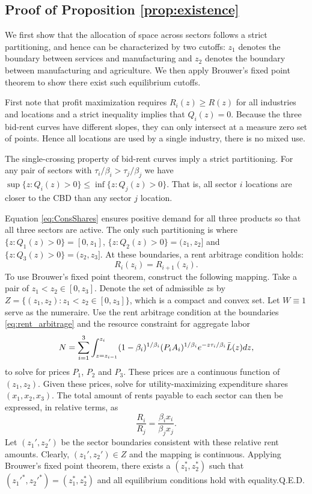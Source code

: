 \documentclass[12pt]{article}
\begin{document}
\subsection{Proof of Proposition \ref{prop:existence}}
We first show that the allocation of space across sectors follows a strict partitioning, and hence can be characterized by two cutoffs: $z_1$ denotes the boundary between services and manufacturing and $z_2$ denotes the boundary between manufacturing and agriculture. We then apply Brouwer's fixed point theorem to show there exist such equilibrium cutoffs.

First note that profit maximization requires $R_i(z)\ge R(z)$ for all industries and locations and a strict inequality implies that $Q_i(z)=0$. Because the three bid-rent curves have different slopes, they can only intersect at a measure zero set of points. Hence all locations are used by a single industry, there is no mixed use.

The single-crossing property of bid-rent curves imply a strict partitioning. For any pair of sectors with $\tau_i/\beta_i>\tau_j/\beta_j$ we have $\sup\{z: Q_i(z)>0\} \le \inf\{z: Q_j(z)>0\}$. That is, all sector $i$ locations are closer to the CBD than any sector $j$ location. 

Equation \eqref{eq:ConsShares} ensures positive demand for all three products so that all three sectors are active. The only such partitioning is where $\{z: Q_1(z)>0\} = [0,z_1]$, $\{z: Q_2(z)>0\} = (z_1,z_2]$ and $\{z: Q_3(z)>0\} = (z_2,z_3]$. At these boundaries, a rent arbitrage condition holds:
\begin{equation}\label{eq:rent_arbitrage}
	R_i(z_i) = R_{i+1}(z_i).
\end{equation}
To use Brouwer's fixed point theorem, construct the following mapping. Take a pair of $z_1<z_2 \in [0,z_3]$. Denote the set of admissible $z$s by $Z=\{(z_1,z_2): z_1<z_2 \in [0,z_3]\}$, which is a compact and convex set. Let $W\equiv 1$ serve as the numeraire. Use the rent arbitrage condition at the boundaries \eqref{eq:rent_arbitrage} and the resource constraint for aggregate labor
\[
N = \sum_{i=1}^3 \int_{z=z_{i-1}}^{z_i}(1-\beta_i)^{1/\beta_i}
	(P_iA_i)^{1/\beta_i}
	e^{- z \tau_i/\beta_i}\Bar L(z)dz,
\] 
to solve for prices $P_1$, $P_2$ and $P_3$. These prices are a continuous function of $(z_1,z_2)$. 
Given these prices, solve for utility-maximizing expenditure shares $(x_1,x_2,x_3)$. The total amount of rents payable to each sector can then be expressed, in relative terms, as
\[
\frac {R_i}
	{R_j}
=
\frac {\beta_i x_i}
	{\beta_j x_j}.
\]
Let $(z_1',z_2')$ be the sector boundaries consistent with these relative rent amounts. Clearly, $(z_1',z_2')\in Z$ and the mapping is continuous. Applying Brouwer's fixed point theorem, there exists a $(z_1^*,z_2^*)$ such that $(z_1'^{*},z_2'^{*}) = (z_1^*,z_2^*)$ and all equilibrium conditions hold with equality.\hfill Q.E.D.
\end{document}
